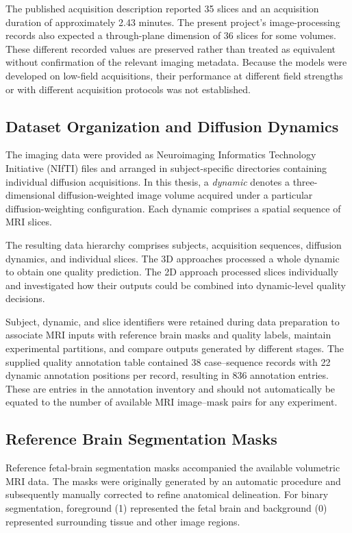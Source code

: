 The published acquisition description reported 35 slices and an acquisition duration of approximately 2.43 minutes. The present project's image-processing records also expected a through-plane dimension of 36 slices for some volumes. These different recorded values are preserved rather than treated as equivalent without confirmation of the relevant imaging metadata. Because the models were developed on low-field acquisitions, their performance at different field strengths or with different acquisition protocols was not established.

\subsection{Dataset Organization and Diffusion Dynamics}

The imaging data were provided as Neuroimaging Informatics Technology Initiative (NIfTI) files and arranged in subject-specific directories containing individual diffusion acquisitions. In this thesis, a \emph{dynamic} denotes a three-dimensional diffusion-weighted image volume acquired under a particular diffusion-weighting configuration. Each dynamic comprises a spatial sequence of MRI slices.

The resulting data hierarchy comprises subjects, acquisition sequences, diffusion dynamics, and individual slices. The 3D approaches processed a whole dynamic to obtain one quality prediction. The 2D approach processed slices individually and investigated how their outputs could be combined into dynamic-level quality decisions.

Subject, dynamic, and slice identifiers were retained during data preparation to associate MRI inputs with reference brain masks and quality labels, maintain experimental partitions, and compare outputs generated by different stages. The supplied quality annotation table contained 38 case--sequence records with 22 dynamic annotation positions per record, resulting in 836 annotation entries. These are entries in the annotation inventory and should not automatically be equated to the number of available MRI image--mask pairs for any experiment.

\subsection{Reference Brain Segmentation Masks}

Reference fetal-brain segmentation masks accompanied the available volumetric MRI data. The masks were originally generated by an automatic procedure and subsequently manually corrected to refine anatomical delineation. For binary segmentation, foreground (1) represented the fetal brain and background (0) represented surrounding tissue and other image regions.

